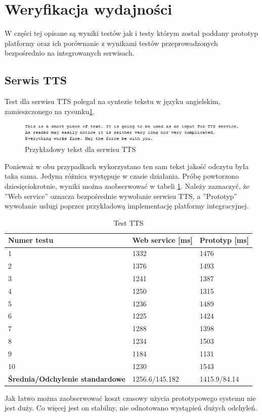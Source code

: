 \section{Weryfikacja wydajności}
W części tej opisane są wyniki testów jak i testy którym został poddany prototyp platformy oraz ich porównanie z wynikami testów przeprowadzonych bezpośrednio na integrowanych serwisach.
\subsection{Serwis TTS}
Test dla serwisu TTS polegał na syntezie tekstu  w języku angielskim, zamieszczonego na rysunku\ref{fig:ttsExample}.
\begin{figure}[!h]
\centering
\includegraphics[scale=0.9]{textExample.png}
\caption{Przykładowy tekst dla serwisu TTS}\label{fig:ttsExample}
\end{figure}
Ponieważ w obu przypadkach wykorzystano ten sam tekst jakość odczytu była taka sama. Jedyna różnica występuje w czasie działania. Próbę powtorzono dziesięciokrotnie, wyniki można zaobserwować w tabeli \ref{tab:TTS}. Należy zaznaczyć, że ''Web service'' oznacza bezpośrednie wywołanie serwisu TTS, a ''Prototyp'' wywołanie usługi poprzez przykładową implementację platformy integracyjnej.
\begin{center}
	\begin{table}[h]
	\label{tab:TTS}
	\caption{Test TTS}
	\centering
	\begin{tabular}{| l | l | l |}	
		\hline
		\textbf{Numer testu} & \textbf{Web service [ms]} & \textbf{Prototyp [ms]} \\ \hline
		1 & 1332 & 1476\\ \hline
		2 & 1376 & 1493\\ \hline
		3 & 1241 & 1387\\ \hline
		4 & 1250 & 1315\\ \hline
		5 & 1236 & 1489\\ \hline
		6 & 1225 & 1424\\ \hline
		7 & 1288 & 1398\\ \hline
		8 & 1234 & 1503\\ \hline
		9 & 1184 & 1131\\ \hline
		10 & 1230 & 1543\\ \hline
		\textbf{Średnia/Odchylenie standardowe} & 1256.6/145.182 & 1415.9/84.14\\ 
		\hline
	\end{tabular}
	\end{table}
\end{center}
Jak łatwo można zaobserwować koszt czasowy użycia prototypowego systemu nie jest duży. Co więcej jest on stabilny, nie odnotowano wystąpień dużych odchyleń. 

